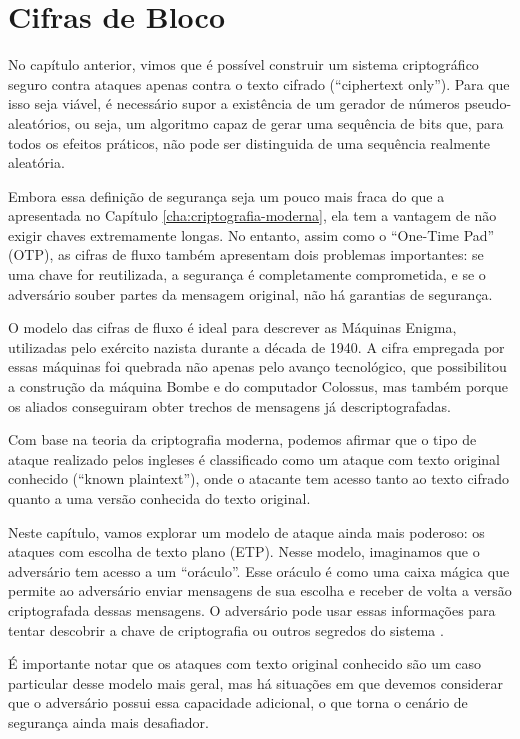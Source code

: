 \chapter{Cifras de Bloco}
\label{cha:cifras-de-bloco}

No capítulo anterior, vimos que é possível construir um sistema criptográfico seguro contra ataques apenas contra o texto cifrado (``ciphertext only'').
Para que isso seja viável, é necessário supor a existência de um gerador de números pseudo-aleatórios, ou seja, um algoritmo capaz de gerar uma sequência de bits que, para todos os efeitos práticos, não pode ser distinguida de uma sequência realmente aleatória.

Embora essa definição de segurança seja um pouco mais fraca do que a apresentada no Capítulo \ref{cha:criptografia-moderna}, ela tem a vantagem de não exigir chaves extremamente longas.
No entanto, assim como o ``One-Time Pad'' (OTP), as cifras de fluxo também apresentam dois problemas importantes:
se uma chave for reutilizada, a segurança é completamente comprometida, e se o adversário souber partes da mensagem original, não há garantias de segurança.

O modelo das cifras de fluxo é ideal para descrever as Máquinas Enigma, utilizadas pelo exército nazista durante a década de 1940.
A cifra empregada por essas máquinas foi quebrada não apenas pelo avanço tecnológico, que possibilitou a construção da máquina Bombe e do computador Colossus, mas também porque os aliados conseguiram obter trechos de mensagens já descriptografadas.

Com base na teoria da criptografia moderna, podemos afirmar que o tipo de ataque realizado pelos ingleses é classificado como um ataque com texto original conhecido (``known plaintext''), onde o atacante tem acesso tanto ao texto cifrado quanto a uma versão conhecida do texto original.

Neste capítulo, vamos explorar um modelo de ataque ainda mais poderoso:
os ataques com escolha de texto plano (ETP).
Nesse modelo, imaginamos que o adversário tem acesso a um ``oráculo''.
Esse oráculo é como uma caixa mágica que permite ao adversário enviar mensagens de sua escolha e receber de volta a versão criptografada dessas mensagens.
O adversário pode usar essas informações para tentar descobrir a chave de criptografia ou outros segredos do sistema \cite{Bellare97}.

É importante notar que os ataques com texto original conhecido são um caso particular desse modelo mais geral, mas há situações em que devemos considerar que o adversário possui essa capacidade adicional, o que torna o cenário de segurança ainda mais desafiador.


